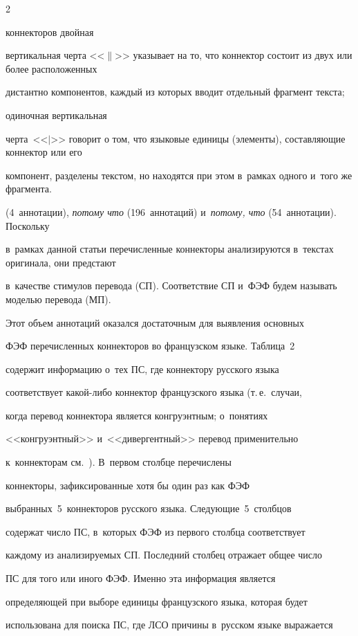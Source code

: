 \begin{multicols}{2}
{коннекторов двойная 


вертикальная черта <<$\|$>> указывает на то, что коннектор состоит из двух или более расположенных 


дистантно компонентов, каждый из которых вводит отдельный фрагмент текста; 


одиночная вертикальная 


черта~<<$\vert$>> говорит о том, что языковые единицы (элементы), составляющие коннектор или его 


компонент, разделены текстом, но находятся при этом в~рамках одного и~того же фрагмента.} 


(4~аннотации), \textit{потому что} (196~аннотаций) и~\textit{потому, что} (54~аннотации). Поскольку 


в~рамках данной статьи перечисленные коннекторы анализируются в~текстах оригинала, они предстают 


в~качестве стимулов перевода (СП). Соответствие СП и~ФЭФ будем называть моделью перевода (МП).


   


   Этот объем аннотаций оказался достаточным для выявления основных 


ФЭФ перечисленных коннекторов во французском языке. Таблица~2 


содержит информацию о~тех ПС, где коннектору русского языка 


соответствует ка\-кой-ли\-бо коннектор французского языка (т.\,е.\ случаи, 


когда перевод коннектора является конгруэнтным; о~понятиях 


<<конгруэнтный>> и~<<дивергентный>> перевод применительно 


к~коннекторам см.~\cite{13-in}). В~первом столбце пе\-ре\-чис\-ле\-ны  


коннекторы, зафиксированные хотя бы один раз как ФЭФ 


выбранных~5~коннекторов русского языка. Следующие~5~столб\-цов 


содержат число ПС, в~которых ФЭФ из первого столбца соответствует 


каждому из анализируемых СП. Последний столбец отражает общее число 


ПС для того или иного ФЭФ. Именно эта информация является 


определяющей при выборе единицы французского языка, которая будет 


использована для поиска ПС, где ЛСО причины в~русском языке выражается 



\end{multicols}
